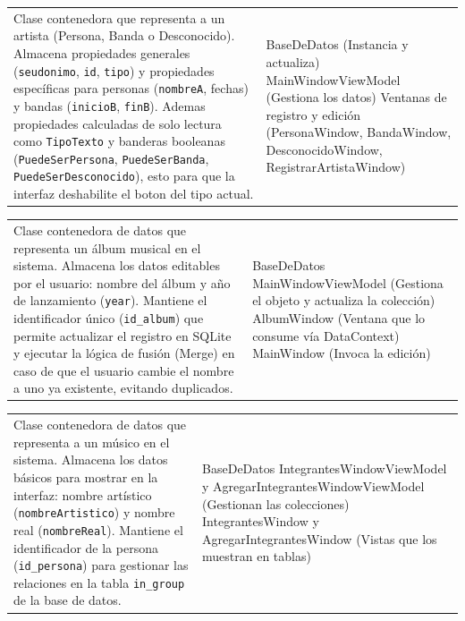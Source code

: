 \documentclass{article}
\newcommand{\tarjeta}[3]{%
      \begin{center}
      \begin{tabular}{|>{\raggedright\arraybackslash}p{7.8cm}|>{\raggedright\arraybackslash}p{4.2cm}|}
        \hline
        \multicolumn{2}{|c|}{#1} \\ \hline
        #2 & #3 \\ \hline
      \end{tabular}
      \end{center}
    }
\begin{document}
\tarjeta{Artista (Modelo de Datos / DTO)}
{Clase contenedora que representa a un artista (Persona, Banda o Desconocido).\newline
Almacena propiedades generales (\texttt{seudonimo}, \texttt{id}, \texttt{tipo}) y propiedades específicas para personas (\texttt{nombreA}, fechas) y bandas (\texttt{inicioB}, \texttt{finB}).\newline
Ademas propiedades calculadas de solo lectura como \texttt{TipoTexto} y banderas booleanas (\texttt{PuedeSerPersona}, \texttt{PuedeSerBanda}, \texttt{PuedeSerDesconocido}), esto para que la interfaz deshabilite el boton del tipo actual.
}
{BaseDeDatos (Instancia y actualiza)\newline
MainWindowViewModel (Gestiona los datos)\newline
Ventanas de registro y edición (PersonaWindow, BandaWindow, DesconocidoWindow, RegistrarArtistaWindow)
}

\tarjeta{Album (Modelo de Datos / DTO)}
{Clase contenedora de datos que representa un álbum musical en el sistema.\newline
Almacena los datos editables por el usuario: nombre del álbum y año de lanzamiento (\texttt{year}).\newline
Mantiene el identificador único (\texttt{id\_album}) que permite actualizar el registro en SQLite y ejecutar la lógica de fusión (Merge) en caso de que el usuario cambie el nombre a uno ya existente, evitando duplicados.
}
{BaseDeDatos\newline
MainWindowViewModel (Gestiona el objeto y actualiza la colección)\newline
AlbumWindow (Ventana que lo consume vía DataContext)\newline
MainWindow (Invoca la edición)
}

\tarjeta{Integrante (Modelo de Datos / DTO)}
{Clase contenedora de datos que representa a un músico en el sistema.\newline
Almacena los datos básicos para mostrar en la interfaz: nombre artístico (\texttt{nombreArtistico}) y nombre real (\texttt{nombreReal}).\newline
Mantiene el identificador de la persona (\texttt{id\_persona}) para gestionar las relaciones en la tabla \texttt{in\_group} de la base de datos.
}
{BaseDeDatos\newline
IntegrantesWindowViewModel y AgregarIntegrantesWindowViewModel (Gestionan las colecciones)\newline
IntegrantesWindow y AgregarIntegrantesWindow (Vistas que los muestran en tablas)
}
\end{document}
